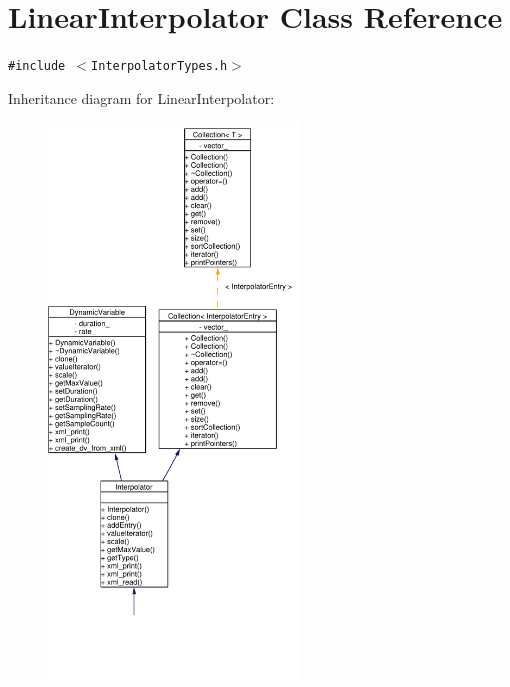 \hypertarget{classLinearInterpolator}{
\section{Linear\-Interpolator Class Reference}
\label{classLinearInterpolator}
}
{\tt \#include $<$Interpolator\-Types.h$>$}

Inheritance diagram for Linear\-Interpolator:\begin{figure}[H]
\begin{center}
\leavevmode
\includegraphics[width=189pt]{classLinearInterpolator__inherit__graph}
\end{center}
\end{figure}
